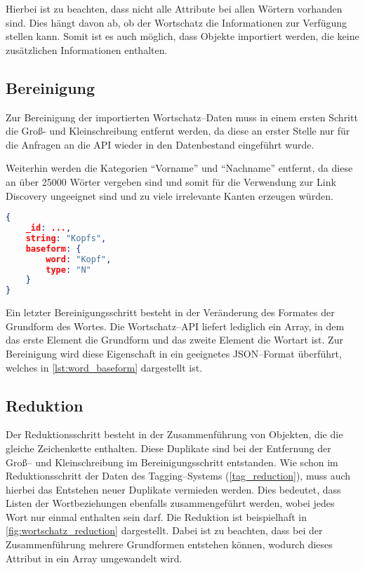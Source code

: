 Hierbei ist zu beachten, dass nicht alle Attribute bei allen Wörtern vorhanden sind. Dies hängt davon ab, ob der Wortschatz die Informationen zur Verfügung stellen kann. Somit ist es auch möglich, dass Objekte importiert werden, die keine zusätzlichen Informationen enthalten.

\subsection{Bereinigung}

Zur Bereinigung der importierten Wortschatz--Daten muss in einem ersten Schritt die Groß- und Kleinschreibung entfernt werden, da diese an erster Stelle nur für die Anfragen an die API wieder in den Datenbestand eingeführt wurde.

Weiterhin werden die Kategorien ``Vorname'' und ``Nachname'' entfernt, da diese an über \num{25000} Wörter vergeben sind und somit für die Verwendung zur Link Discovery ungeeignet sind und zu viele irrelevante Kanten erzeugen würden.

\begin{lstlisting}[language=json, label={lst:word_baseform}, caption={JSON--Beispiel für die Umformung der Grundform eines Wortes}, float]
{
    _id: ...,
    string: "Kopfs",
    baseform: {
        word: "Kopf",
        type: "N"
    }
}
\end{lstlisting}

Ein letzter Bereinigungsschritt besteht in der Veränderung des Formates der Grundform des Wortes. Die Wortschatz--API liefert lediglich ein Array, in dem das erste Element die Grundform und das zweite Element die Wortart ist. Zur Bereinigung wird diese Eigenschaft in ein geeignetes JSON--Format überführt, welches in \cref{lst:word_baseform} dargestellt ist.

\subsection{Reduktion}

Der Reduktionsschritt besteht in der Zusammenführung von Objekten, die die gleiche Zeichenkette enthalten. Diese Duplikate sind bei der Entfernung der Groß-- und Kleinschreibung im Bereinigungsschritt entstanden. Wie schon im Reduktionsschritt der Daten des Tagging--Systems (\cref{tag_reduction}), muss auch hierbei das Entstehen neuer Duplikate vermieden werden. Dies bedeutet, dass Listen der Wortbeziehungen ebenfalls zusammengeführt werden, wobei jedes Wort nur einmal enthalten sein darf. Die Reduktion ist beispielhaft in \cref{fig:wortschatz_reduction} dargestellt. Dabei ist zu beachten, dass bei der Zusammenführung mehrere Grundformen entstehen können, wodurch dieses Attribut in ein Array umgewandelt wird.

